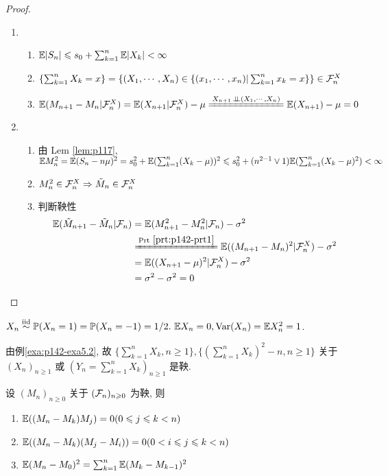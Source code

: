 \begin{proof}
    \begin{enumerate}
        \item \begin{enumerate}
            \item $\mathbb E|S_n|\leqslant s_0+\sum_{k=1}^n \mathbb E|X_k|<\infty$
            \item $\{\sum_{k=1}^n X_k=x\}=\{(X_1,\cdots,X_n)\in \{(x_1,\cdots,x_n)|\sum_{k=1}^n x_k=x\}\}\in \mathcal{F}_n^X$
            \item $\EE(M_{n+1}-M_n|\CF_n^X)=\EE(X_{n+1}|\CF_n^X)-\mu\xlongequal{X_{n+1}\ind (X_1,\cdots,X_n)}\EE(X_{n+1})-\mu=0$
        \end{enumerate}
        \item \begin{enumerate}
            \item 由 Lem \ref{lem:p117}, $\mathbb E M_n^2=\mathbb E(S_n-n\mu)^2=s_0^2+\mathbb E(\sum_{k=1}^n (X_k-\mu))^2\leqslant s_0^2+(n^{2-1}\lor 1)\mathbb E(\sum_{k=1}^n(X_k-\mu)^2)<\infty$
            \item $M_n^2\in\mathcal{F}_n^X\Rightarrow \tilde{M}_n\in\mathcal{F}_n^X$
            \item 判断鞅性
            \[
            \begin{aligned}
                \EE(\tilde{M}_{n+1}-\tilde{M}_n|\CF_n) &=\EE(M_{n+1}^2-M_n^2|\CF_n)-\sigma^2\\
                &\xlongequal{\text{Prt}\ \ref{prt:p142-prt1}} \EE((M_{n+1}-M_n)^2|\CF_n^X)-\sigma^2\\
                &=\EE((X_{n+1}-\mu)^2|\CF_n^X)-\sigma^2\\
                &=\sigma^2-\sigma^2=0
            \end{aligned}
            \]
        \end{enumerate}
    \end{enumerate}
\end{proof}

\begin{example}[简单对称随机游走]
    $X_n\overset{\text{iid}}{\sim} \mathbb{P}(X_n=1)=\mathbb{P}(X_n=-1)=1/2.\ \mathbb E X_n=0, \operatorname{Var}(X_n)=\mathbb E X_n^2=1$.
\end{example}

由例\ref{exa:p142-exa5.2}, 故 $\{\sum_{k=1}^n X_k,n\geq 1\}, \{(\sum_{k=1}^n X_k)^2-n,n\geq 1\}$ 关于 $(X_n)_{n\geq 1}$ 或 $(Y_n=\sum_{k=1}^n X_k)_{n\geq 1}$ 是鞅.

\begin{property}
设 $(M_n)_{n\geq 0}$ 关于 $(\mathcal{F}_n)_{n\geqslant 0}$ 为鞅, 则
\begin{enumerate}
    \item $\mathbb E((M_n-M_k)M_j)=0 (0\leqslant j\leqslant k<n)$
    \item $\mathbb E((M_n-M_k)(M_j-M_i))=0 (0<i\leqslant j\leqslant k<n)$
    \item $\mathbb E(M_n-M_0)^2=\sum_{k=1}^n \mathbb E(M_k-M_{k-1})^2$
\end{enumerate}
\end{property}

